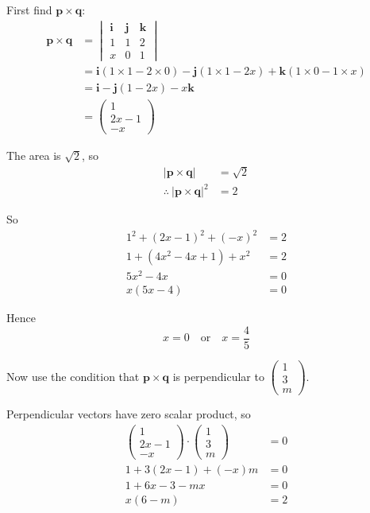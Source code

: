 \documentclass[leqno]{article}
\begin{document}
\begin{enumerate}[
  label=\textbf{\arabic*.},
  leftmargin=*,
  topsep=0pt,
  partopsep=0pt,
  parsep=0pt
]
\begin{djsSolution}
\begin{enumerate}[label=\textbf{(\alph*)}]
First find \(\mathbf p\times \mathbf q\):
\begin{align*}
\mathbf p\times \mathbf q
&=
\begin{vmatrix}
\mathbf i & \mathbf j & \mathbf k\\
1&1&2\\
x&0&1
\end{vmatrix} \\
&= \mathbf i(1\times 1-2\times 0)-\mathbf j(1\times 1-2x)+\mathbf k(1\times 0-1\times x) \\
&= \mathbf i-\mathbf j(1-2x)-x\mathbf k \\
&= \begin{pmatrix}1\\2x-1\\-x\end{pmatrix}
\end{align*}

The area is \(\sqrt2\), so
\begin{align*}
|\mathbf p\times \mathbf q|&=\sqrt2 \\
\therefore \ |\mathbf p\times \mathbf q|^2&=2
\end{align*}

So
\begin{align*}
1^2+(2x-1)^2+(-x)^2&=2 \\
1+(4x^2-4x+1)+x^2&=2 \\
5x^2-4x&=0 \\
x(5x-4)&=0
\end{align*}

Hence
\[
x=0 \quad \text{or} \quad x=\frac45
\]

Now use the condition that \(\mathbf p\times \mathbf q\) is perpendicular to \(\begin{pmatrix}1\\3\\m\end{pmatrix}\).

Perpendicular vectors have zero scalar product, so
\begin{align*}
\begin{pmatrix}1\\2x-1\\-x\end{pmatrix}\cdot \begin{pmatrix}1\\3\\m\end{pmatrix}&=0 \\
1+3(2x-1)+(-x)m&=0 \\
1+6x-3-mx&=0 \\
x(6-m)&=2
\end{align*}


\end{enumerate}
\end{djsSolution}
\end{enumerate}
\end{document}
